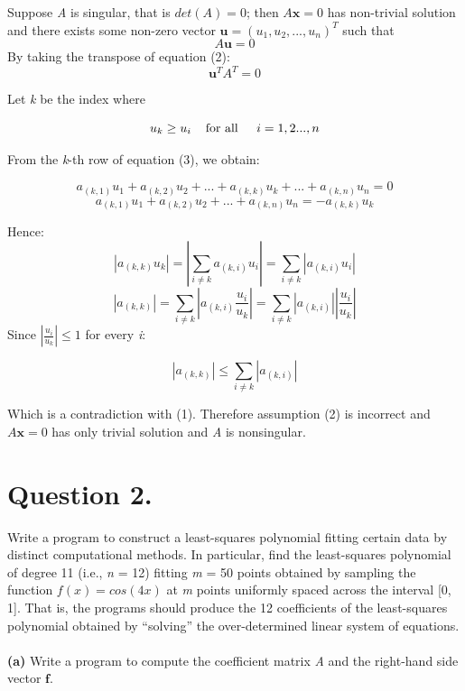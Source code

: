 \documentclass[a4paper,11pt]{article}
\newcommand\tab[1][4mm]{\hspace*{#1}}
\newcommand{\abs}[1]{\left\vert #1 \right\vert}
\begin{document}
\begin{margin}{0.5cm}{0.5cm}
	Suppose \textit{A} is singular, that is $det(A)=0$; then $A\mathbf{x}=0$ has non-trivial solution and there exists some non-zero vector $\mathbf{u}=(u_1, u_2,...,u_n)^T$ such that
	\begin{equation}
		A\mathbf{u}=0
	\end{equation}
	By taking the transpose of equation (2):
	\begin{equation}
		\mathbf{u}^T A^T=0
	\end{equation}
	
	Let \textit{k} be the index where
	
	\begin{equation*}
		u_k \geq u_i \tab \text{for all } \tab i=1,2...,n
	\end{equation*}
	
	From the \textit{k}-th row of equation (3), we obtain:
	
	\begin{equation}
		a_{(k,1)}u_1 + a_{(k,2)}u_2+...+a_{(k,k)}u_k+...+a_{(k,n)}u_n=0
	\end{equation}
	\begin{equation*}
		a_{(k,1)}u_1 + a_{(k,2)}u_2+...+a_{(k,n)}u_n=-a_{(k,k)}u_k
	\end{equation*}
	
	Hence:
	\begin{equation}
		\abs{a_{(k,k)}u_k}=\abs{\sum\limits_{i\neq k} a_{(k,i)}u_i }=\sum\limits_{i\neq k} \abs{a_{(k,i)}u_i}
	\end{equation}
	\begin{equation*}
		\abs{a_{(k,k)}}=\sum\limits_{i\neq k} \abs{a_{(k,i)}\frac{u_i}{u_k}}=\sum\limits_{i\neq k} \abs{a_{(k,i)}}\abs{\frac{u_i}{u_k}}
	\end{equation*}
	Since $\abs{\frac{u_i}{u_k}} \leq 1$ for every \textit{i}:
	
	\begin{equation}
		\abs{a_{(k,k)}} \leq \sum\limits_{i\neq k} \abs{a_{(k,i)}}
	\end{equation}
	
	Which is a contradiction with (1). Therefore assumption (2) is incorrect and $A\mathbf{x}=0$ has only trivial solution and \textit{A} is nonsingular.
\end{margin}

\newpage
\section*{Question 2.}
Write a program to construct a least-squares polynomial fitting certain data by distinct computational methods. In particular, find the least-squares polynomial of degree 11 (i.e., \textit{n} = 12) fitting \textit{m} = 50 points obtained by sampling the function $f(x) = cos(4x)$ at \textit{m} points uniformly spaced across the interval [0, 1]. That is, the programs should produce the 12 coefficients of the least-squares polynomial obtained by “solving” the over-determined linear system of equations.
\\\\
\noindent
\textbf{(a)}  Write a program to compute the coefficient matrix \textit{A} and the right-hand side vector $\mathbf{f}$.
\end{document}
